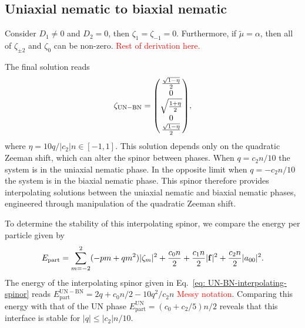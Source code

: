 \subsection{Uniaxial nematic to biaxial nematic}\label{subsec: UN-BN-defects}
Consider \(D_1 \neq 0\) and \(D_2 = 0\), then \(\zeta_1 = \zeta_{-1} = 0\).
Furthermore, if \(\tilde{\mu} = \alpha \), then all of \(\zeta_{\pm 2}\) and
\(\zeta_0\) can be non-zero.
\textcolor{red}{Rest of derivation here.}

The final solution reads
\begin{equation}\label{eq: UN-BN-interpolating-spinor}
    \zeta_\mathrm{UN-BN} = \mqty(
    \frac{\sqrt{1 - \eta}}{2} \\
    0 \\
    \sqrt{\frac{1 + \eta}{2}} \\
    0 \\
    \frac{\sqrt{1 - \eta}}{2}
    ),
\end{equation}
where \(\eta = 10q /|c_2|n \in [-1, 1]\).
This solution depends only on the quadratic Zeeman shift, which can alter the
spinor between phases.
When \(q = c_2n / 10\) the system is in the uniaxial nematic phase.
In the opposite limit when \(q = -c_2n/10\) the system is in the biaxial
nematic phase.
This spinor therefore provides interpolating solutions between the uniaxial
nematic and biaxial nematic phases, engineered through manipulation of the
quadratic Zeeman shift.

To determine the stability of this interpolating spinor, we compare the energy
per particle given by~\cite{Kawaguchi2012}
\begin{equation}
    E_\mathrm{part} = \sum_{m=-2}^{2}(-pm + qm^2)|\zeta_m|^2 + \frac{c_0n}{2}
    + \frac{c_1n}{2}|\vb{f}|^2 + \frac{c_2n}{2}|a_{00}|^2.
\end{equation}
The energy of the interpolating spinor given in
Eq.~\eqref{eq: UN-BN-interpolating-spinor} reads
\(E^\mathrm{UN-BN}_\mathrm{part} = 2q + c_0n/2 - 10q^2/c_2n\)
\textcolor{red}{Messy notation}.
Comparing this energy with that of the UN phase
\(E^\mathrm{UN}_\mathrm{part} = (c_0+c_2/5)n/2\) reveals that this interface is
stable for \(|q| \leq |c_2|n/10\).

